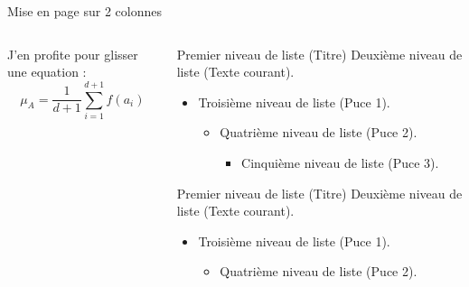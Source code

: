 \begin{frame}{Mise en page sur 2 colonnes}
   \begin{columns}
       
       \begin{column}{0.45\textwidth}
            J'en profite pour glisser une equation : 
            \begin{equation}
               \mu_A = \frac{1}{d+1}\sum_{i=1}^{d+1} f(a_i)
            \end{equation}
  
       \end{column}
         
     \begin{column}{0.45\textwidth}
 
            \begin{block}{Premier niveau de liste (Titre)}
            Deuxième niveau de liste (Texte courant).
              \begin{itemize}
                \item Troisième niveau de liste (Puce 1).
                    \begin{itemize}
                      \item Quatrième niveau de liste (Puce 2).
                         \begin{itemize}
                            \item Cinquième niveau de liste (Puce 3).
                         \end{itemize}
                    \end{itemize}
              \end{itemize}
            \end{block}
 
            \begin{block}{Premier niveau de liste (Titre)}
            Deuxième niveau de liste (Texte courant).
              \begin{itemize}
                \item Troisième niveau de liste (Puce 1).
                    \begin{itemize}
                      \item Quatrième niveau de liste (Puce 2).
                    \end{itemize}
              \end{itemize}
            \end{block}
 
          \end{column}
          
   \end{columns}
 \end{frame}

